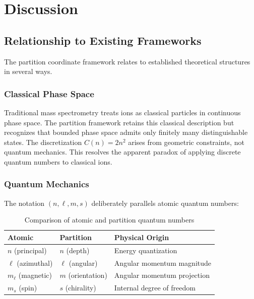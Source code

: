 \documentclass[twocolumn,10pt]{article}
\begin{document}
\section{Discussion}
\label{sec:discussion}

\subsection{Relationship to Existing Frameworks}

The partition coordinate framework relates to established theoretical structures in several ways.

\subsubsection{Classical Phase Space}

Traditional mass spectrometry treats ions as classical particles in continuous phase space. The partition framework retains this classical description but recognizes that bounded phase space admits only finitely many distinguishable states. The discretization $C(n) = 2n^2$ arises from geometric constraints, not quantum mechanics. This resolves the apparent paradox of applying discrete quantum numbers to classical ions.

\subsubsection{Quantum Mechanics}

The notation $(n, \ell, m, s)$ deliberately parallels atomic quantum numbers:

\begin{table}[h]
\centering
\caption{Comparison of atomic and partition quantum numbers}
\label{tab:comparison}
\begin{tabular}{lll}
\toprule
\textbf{Atomic} & \textbf{Partition} & \textbf{Physical Origin} \\
\midrule
$n$ (principal) & $n$ (depth) & Energy quantization \\
$\ell$ (azimuthal) & $\ell$ (angular) & Angular momentum magnitude \\
$m_\ell$ (magnetic) & $m$ (orientation) & Angular momentum projection \\
$m_s$ (spin) & $s$ (chirality) & Internal degree of freedom \\
\bottomrule
\end{tabular}
\end{table}
\end{document}
